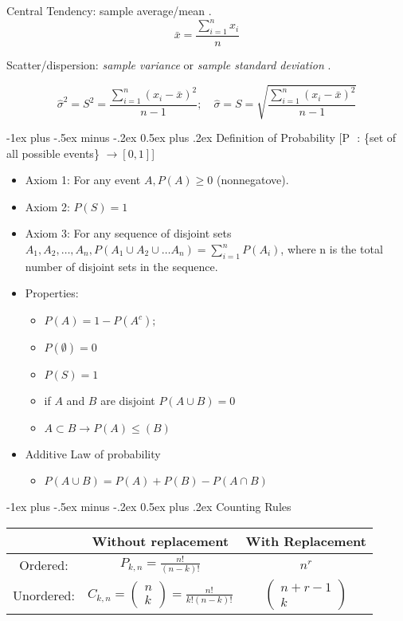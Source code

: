 \documentclass[10pt,landscape]{article}
\makeatletter
\renewcommand{\section}{\@startsection{section}{1}{0mm}%
                                {-1ex plus -.5ex minus -.2ex}%
                                {0.5ex plus .2ex}%
                                {\normalfont\large\bfseries}}
\makeatother
\begin{document}
\begin{multicols}{3}
Central Tendency: sample average/mean \cite[p.14]{classnotes.1}.
$$\bar{x}=\frac{\sum\limits_{i=1}^{n} x_i}{n}$$

Scatter/dispersion: \emph{sample variance} or \emph{sample standard deviation} \cite[p.14]{classnotes.1}.

$$\hat{\sigma}^2=S^2=\frac{\sum\limits_{i=1}^{n}(x_i-\bar{x})^2}{n-1};\quad\hat{\sigma}=S=\sqrt{\frac{\sum\limits_{i=1}^{n}(x_i-\bar{x})^2}{n-1}}$$

\section{Definition of Probability \cite[p.4]{classnotes.2}}
[P \(\) : \{set of all possible events\} $\rightarrow [0,1]$]
\begin{itemize}
\item Axiom 1: For any event $A, P(A)\geq 0$ (nonnegatove).
\item Axiom 2: $P(S)=1$
\item Axiom 3: For any sequence of disjoint sets $A_1,A_2,\dots,A_n, P(A_1 \cup A_2 \cup \dots A_n)=\sum\limits_{i=1}^nP(A_i)$, where n is the total number of disjoint sets in the sequence.
\end {itemize}
\begin{itemize}
\item Properties:
\begin{itemize}
\item $P(A)=1-P(A^c);$
\item $P(\emptyset)=0$
\item $P(S)=1$
\item if $A$ and $B$ are disjoint $P(A\cup B)=0$
\item $A\subset B \rightarrow P(A)\leq (B)$
\end{itemize}
\item Additive Law of probability
\begin{itemize}
\item $P(A \cup B) = P(A) + P(B) - P(A \cap B)$
\end{itemize}
\end{itemize}

\section{Counting Rules}
\begin{tabular}{| c | c | c |} \hline
 & Without replacement & With Replacement \\ \hline
Ordered: & $P_{k,n} = \frac{n!}{(n-k)!}$ & $n^r$ \\ \hline
Unordered: & $C_{k,n}=
\begin{pmatrix}
n \\
k
\end{pmatrix}
=\frac{n!}{k!(n-k)!}
$ & 
$
\begin{pmatrix}
n + r - 1\\
k
\end{pmatrix}$
\\ \hline
\end{tabular}


\end{multicols}
\end{document}

